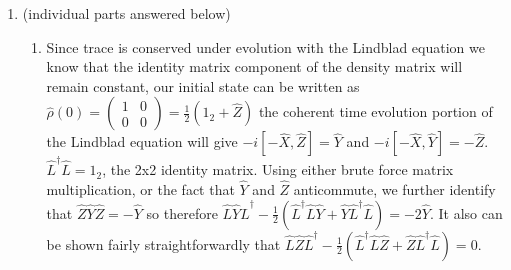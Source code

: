 \documentclass[english]{article}
\begin{document}
\begin{enumerate}
\begin{enumerate}
\end{enumerate}
\item (individual parts answered below)
\begin{enumerate}
\item Since trace is conserved under evolution with the Lindblad equation we know that the identity matrix component of the density matrix will remain constant, our initial state can be written as $\hat{\rho}(0)=\left(\begin{array}{cc} 1 & 0 \\ 0 & 0 \end{array}\right)=\frac{1}{2}(1_2+\hat{Z})$ the coherent time evolution portion of the Lindblad equation will give $-i[-\hat{X},\hat{Z}]=\hat{Y}$ and $-i[-\hat{X},\hat{Y}]=-\hat{Z}$. $\hat{L}^\dagger\hat{L}=1_2$, the 2x2 identity matrix. Using either brute force matrix multiplication, or the fact that $\hat{Y}$ and $\hat{Z}$ anticommute, we further identify that $\hat{Z}\hat{Y}\hat{Z}=-\hat{Y}$ so therefore $\hat{L}\hat{Y}\hat{L}^\dagger-\frac{1}{2}(\hat{L}^\dagger\hat{L}\hat{Y}+\hat{Y}\hat{L}^\dagger\hat{L})=-2\hat{Y}$. It also  can be shown fairly straightforwardly that $\hat{L}\hat{Z}\hat{L}^\dagger-\frac{1}{2}(\hat{L}^\dagger\hat{L}\hat{Z}+\hat{Z}\hat{L}^\dagger\hat{L})=0$.


\end{enumerate}
\end{enumerate}
\end{document}
